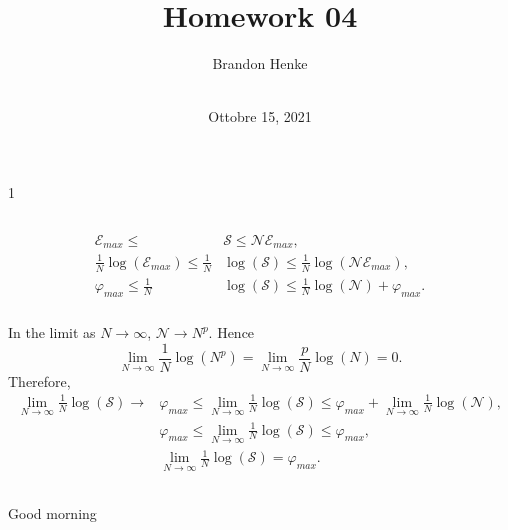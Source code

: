 \documentclass[a4paper,12pt,twoside]{article}
\title{Homework 04}
\author{
	Brandon Henke\\
	\course\\
	\professor
}
\date{Ottobre 15, 2021}
\newcommand{\mcols}{0}
\begin{document}

\maketitle
\if\mcols1
\begin{multicols*}{2}
\fi

\setcounter{section}{4}
\subsection{}%
\subsubsection{}
\begin{align}
	\mathcal{E}_{max} \leq &\mathcal{S} \leq \mathcal{N} \mathcal{E}_{max},\\
	\frac{1}{N}\log(\mathcal{E}_{max}) \leq \frac{1}{N}&\log(\mathcal{S}) \leq \frac{1}{N}\log(\mathcal{N} \mathcal{E}_{max}),\\
	\varphi_{max} \leq \frac{1}{N}&\log(\mathcal{S}) \leq \frac{1}{N}\log(\mathcal{N}) + \varphi_{max}.
\end{align}
\subsubsection{}
In the limit as $N\rightarrow\infty$, $\mathcal{N} \rightarrow N^p$.
Hence
\begin{equation}
	\lim_{N\rightarrow \infty} \frac{1}{N} \log(N^p) = \lim_{N\rightarrow \infty} \frac{p}{N} \log(N) = 0.
\end{equation}
Therefore,
\begin{align}
	\lim_{N\rightarrow\infty} \frac{1}{N}\log(\mathcal{S}) \rightarrow &\varphi_{max}
	\leq \lim_{N\rightarrow\infty} \frac{1}{N}\log(\mathcal{S})
	\leq \varphi_{max}+ \lim_{N\rightarrow\infty} \frac{1}{N}\log(\mathcal{N}),\\
	&\varphi_{max}
	\leq \lim_{N\rightarrow\infty} \frac{1}{N}\log(\mathcal{S})
	\leq \varphi_{max},\\
	&\lim_{N\rightarrow\infty} \frac{1}{N}\log(\mathcal{S}) = \varphi_{max}.
\end{align}
\subsection{}%
Good morning
\subsection{}%

\end{multicols*}
\end{document}

